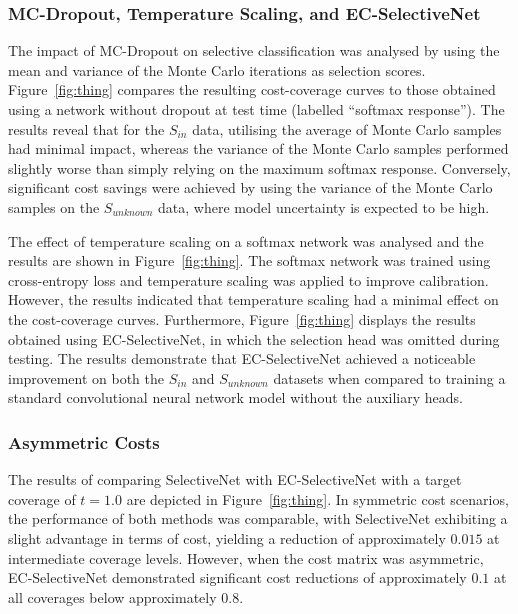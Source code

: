 \subsubsection{MC-Dropout, Temperature Scaling, and EC-SelectiveNet}
The impact of MC-Dropout on selective classification was analysed by using the mean and variance of the Monte Carlo iterations as selection scores. Figure~\ref{fig:thing} compares the resulting cost-coverage curves to those obtained using a network without dropout at test time (labelled “softmax response”). The results reveal that for the $S_{in}$ data, utilising the average of Monte Carlo samples had minimal impact, whereas the variance of the Monte Carlo samples performed slightly worse than simply relying on the maximum softmax response. Conversely, significant cost savings were achieved by using the variance of the Monte Carlo samples on the $S_{unknown}$ data, where model uncertainty is expected to be high.

The effect of temperature scaling on a softmax network was analysed and the results are shown in Figure~\ref{fig:thing}. The softmax network was trained using cross-entropy loss and temperature scaling was applied to improve calibration. However, the results indicated that temperature scaling had a minimal effect on the cost-coverage curves. Furthermore, Figure~\ref{fig:thing} displays the results obtained using EC-SelectiveNet, in which the selection head was omitted during testing. The results demonstrate that EC-SelectiveNet achieved a noticeable improvement on both the $S_{in}$ and $S_{unknown}$ datasets when compared to training a standard convolutional neural network model without the auxiliary heads.

\subsubsection{Asymmetric Costs}
The results of comparing SelectiveNet with EC-SelectiveNet with a target coverage of $t=1.0$ are depicted in Figure~\ref{fig:thing}. In symmetric cost scenarios, the performance of both methods was comparable, with SelectiveNet exhibiting a slight advantage in terms of cost, yielding a reduction of approximately $0.015$ at intermediate coverage levels. However, when the cost matrix was asymmetric, EC-SelectiveNet demonstrated significant cost reductions of approximately $0.1$ at all coverages below approximately $0.8$.

